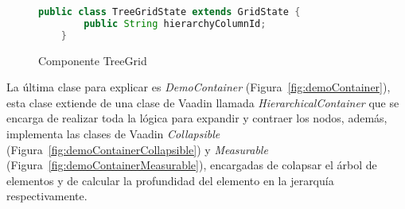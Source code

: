 \begin{figure}[!tb]
	\centering
	\begin{lstlisting}[language=Java]
	public class TreeGridState extends GridState {
		public String hierarchyColumnId;
	}\end{lstlisting}
	\caption{Componente TreeGrid}
	\label{fig:treeGridState}
\end{figure}


La última clase para explicar es \emph{DemoContainer}  (Figura~\ref{fig:demoContainer}), esta clase extiende de una clase de Vaadin llamada \emph{HierarchicalContainer} que se encarga de realizar toda la lógica para expandir y contraer los nodos, además, implementa las clases de Vaadin \emph{Collapsible} (Figura~\ref{fig:demoContainerCollapsible}) y \emph{Measurable} (Figura~\ref{fig:demoContainerMeasurable}), encargadas de colapsar el árbol de elementos y de calcular la profundidad del elemento en la jerarquía respectivamente.





